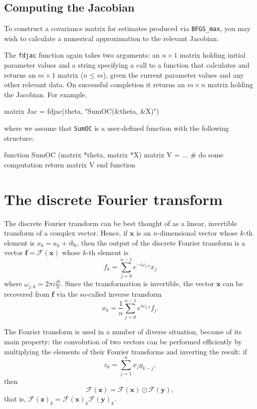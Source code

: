 \subsection{Computing the Jacobian}

To construct a covariance matrix for estimates produced via
\verb+BFGS_max+, you may wish to calculate a numerical approximation
to the relevant Jacobian.

The \texttt{fdjac} function again takes two arguments: an $n \times 1$
matrix holding initial parameter values and a string specifying a call
to a function that calculates and returns an $m \times 1$ matrix ($n
\leq m$), given the current parameter values and any other relevant
data.  On successful completion it returns an $m \times n$ matrix
holding the Jacobian.  For example,
%
\begin{code}
matrix Jac = fdjac(theta, "SumOC(&theta, &X)")
\end{code}
where we assume that \texttt{SumOC} is a user-defined function with
the following structure:
%
\begin{code}
function SumOC (matrix *theta, matrix *X)
  matrix V = ...  # do some computation
  return matrix V
end function
\end{code}

\section{The discrete Fourier transform}
\label{sec:genr-fft}

The discrete Fourier transform can be best thought of as a linear,
invertible transform of a complex vector. Hence, if $\mathbf{x}$ is an
$n$-dimensional vector whose $k$-th element is $x_k = a_k + i b_k$,
then the output of the discrete Fourier transform is a vector
$\mathbf{f} = \mathcal{F}(\mathbf{x})$ whose $k$-th element is
\[
  f_k = \sum_{j=0}^{n-1} e^{-i \omega_{j,k} } x_j 
\]
where $\omega_{j,k} = 2 \pi i \frac{j k}{n}$. Since the transformation
is invertible, the vector $\mathbf{x}$ can be recovered from
$\mathbf{f}$ via the so-called inverse transform
\[
  x_k = \frac{1}{n} \sum_{j=0}^{n-1} e^{i \omega_{j,k} } f_j .
\]

The Fourier transform is used in a number of diverse situation,
because of its main property: the convolution of two vectors can be
performed efficiently by multiplying the elements of their Fourier
transforms and inverting the result: if
\[
  z_k = \sum_{j=1}^n x_j y_{k-j} ,
\]
then
\[
  \mathcal{F}(\mathbf{z}) = \mathcal{F}(\mathbf{x}) \odot
  \mathcal{F}(\mathbf{y}) ,
\]
that is, $\mathcal{F}(\mathbf{z})_k = \mathcal{F}(\mathbf{x})_k
\mathcal{F}(\mathbf{y})_k$.

